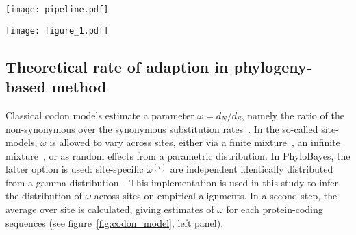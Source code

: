 \documentclass{article}
\begin{document}
\begin{figure*}[hb!]
	\centering
	\texttt{[image: pipeline.pdf]}
	\caption{ \textbf{The python pipeline for data analysis}.
Tables in blue outlines are the input data necessary to run the pipeline.
Tables in black outlines are the data produced by the analysis.
The upper half of the figure depicts the steps necessary to estimate polymorphism and divergence statistics necessary to run population-based method.
The lower half of the figures depicts the steps necessary to run the phylogeny-based method and to obtain figure~\ref{fig:omega_pb} and table~\ref{fig:ontology}, which can be obtained independently of the population-based analysis.
Figure~\ref{fig:omega_snp} is obtained by merging the results of the population- and the phylogeny-based analysis.
The code available at \href{https://github.com/ThibaultLatrille/AdaptaPop}{https://github.com/ThibaultLatrille/AdaptaPop} allows one to reproduce the figures of this study.
\label{fig:pipeline}}
\end{figure*}

\begin{figure*}[hb!]
	\centering
	\texttt{[image: figure\_1.pdf]}
	\caption{ \textbf{Detection of protein-coding sequences ongoing adaptation}.
\textbf{Panel A}: scatter plot of $\omega$ (y-axis), such as estimated by the site-model, against $\omega_{0}$ (x-axis), such as estimated by the mutation-selection model for $1,355$ CDS.
The linear correlation shows a good empirical fit but outliers (in red) are CDS with significantly high $\omega_A = \omega - \omega_{0}$.
\textbf{Panel B}: for the 27 outliers CDS, scatter plot of $\omega_A$ (y-axis) against $\omega_{0}$ (x-axis).
The linear correlation is very poor suggesting that $\omega_A$ effectively extract the adaption regardless of the background of purifying selection ($\omega_0$)  \label{fig:omega_pb}}
\end{figure*}


\subsection*{Theoretical rate of adaption in phylogeny-based method }
Classical codon models estimate a parameter $\omega=d_N/d_S$, namely the ratio of the non-synonymous over the synonymous substitution rates~\citep{Muse1994,Goldman1994}.
In the so-called site-models, $\omega$ is allowed to vary across sites, either via a finite mixture~\citep{Yang2000}, an infinite mixture~\citep{Huelsenbeck2006}, or as random effects from a parametric distribution.
In PhyloBayes, the latter option is used: site-specific $\omega^{(i)}$ are independent identically distributed from a gamma distribution~\citep{Lartillot2013}.
This implementation is used in this study to infer the distribution of $\omega$ across sites on empirical alignments.
In a second step, the average over site is calculated, giving estimates of $\omega$ for each protein-coding sequences (see figure~\ref{fig:codon_model}, left panel).
\end{document}

